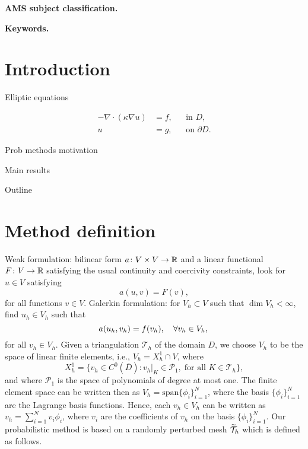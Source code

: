 \documentclass[10pt]{article}
\begin{document}
\maketitle	

\begin{abstract}
	
\end{abstract}

\textbf{AMS subject classification.}

\textbf{Keywords.}

\section{Introduction}

Elliptic equations

\begin{equation}
\begin{aligned}
	-\nabla \cdot (\kappa \nabla u) &= f, &&\text{in } D,\\
	u &= g, &&\text{on } \partial D.
\end{aligned}
\end{equation}

Prob methods \cite{AbG18, KeH16, KSH18, CCC16, CGS16} motivation

Main results

Outline 

\section{Method definition} 

Weak formulation: bilinear form $a\colon V\times V \to \mathbb{R}$ and a linear functional $F\colon V \to \mathbb{R}$ satisfying the usual continuity and coercivity constraints, look for $u \in V$ satisfying
\begin{equation}
	a(u, v) = F(v),	
\end{equation}
for all functions $v \in V$. Galerkin formulation: for $V_h \subset V$ such that $\dim V_h < \infty$, find $u_h \in V_h$ such that
\begin{equation}
	a(u_h, v_h) = f(v_h), \quad \forall v_h \in V_h,\\
\end{equation}
for all $v_h \in V_h$. Given a triangulation $\mathcal T_h$ of the domain $D$, we choose $V_h$ to be the space of linear finite elements, i.e., $V_h = X_h^1 \cap V$, where 
\begin{equation}
	X_h^1 = \{v_h \in C^0(\overline D) \colon v_h|_{K} \in \mathcal P_1, \; \text{for all } K \in \mathcal T_h\},
\end{equation}
and where $\mathcal P_1$ is the space of polynomials of degree at most one. The finite element space can be written then as $V_h = \mathrm{span}\{\phi_i\}_{i=1}^N$, where the basis $\{\phi_i\}_{i=1}^N$ are the Lagrange basis functions. Hence, each $v_h \in V_h$ can be written as $v_h = \sum_{i=1}^N v_i \phi_i$, where $v_i$ are the coefficients of $v_h$ on the basis $\{\phi_i\}_{i=1}^N$. Our probabilistic method is based on a randomly perturbed mesh $\widetilde {\mathcal T}_h$ which is defined as follows.
\end{document}
